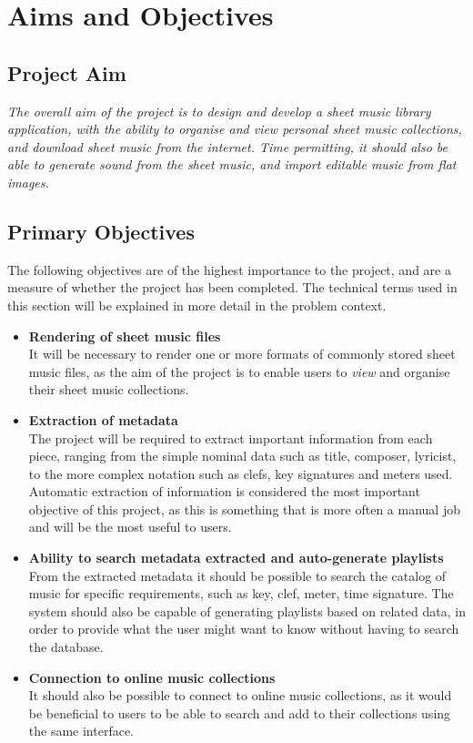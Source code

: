 \section{Aims and Objectives}
\subsection{Project Aim}
\begin{center}
\textit{The overall aim of the project is to design and develop a sheet music library application, with the ability to organise and view personal sheet music collections, and download sheet music from the internet. Time permitting, it should also be able to generate sound from the sheet music, and import editable music from flat images.}
\end{center}
\subsection{Primary Objectives}
The following objectives are of the highest importance to the project, and are a measure of whether the project has been completed. The technical terms used in this section will be explained in more detail in the problem context.
\begin{itemize}
	\item \textbf{Rendering of sheet music files}\\
    It will be necessary to render one or more formats of commonly stored sheet music files, as the aim of the project is to enable users to \textit{view} and organise their sheet music collections. 
    \item \textbf{Extraction of metadata}\\
    The project will be required to extract important information from each piece, ranging from the simple nominal data such as title, composer, lyricist, to the more complex notation such as clefs, key signatures and meters used. Automatic extraction of information is considered the most important objective of this project, as this is something that is more often a manual job and will be the most useful to users. 
    \item \textbf{Ability to search metadata extracted and auto-generate playlists}\\ From the extracted metadata it should be possible to search the catalog of music for specific requirements, such as key, clef, meter, time signature. The system should also be capable of generating playlists based on related data, in order to provide what the user might want to know without having to search the database.
    \item \textbf{Connection to online music collections}\\
    It should also be possible to connect to online music collections, as it would be beneficial to users to be able to search and add to their collections using the same interface.

\end{itemize}

